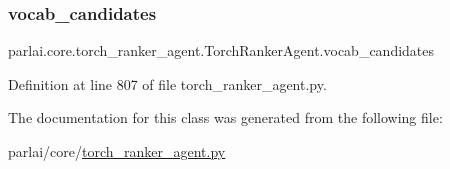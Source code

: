 \subsubsection{\texorpdfstring{vocab\+\_\+candidates}{vocab\_candidates}}
{\footnotesize\ttfamily parlai.\+core.\+torch\+\_\+ranker\+\_\+agent.\+Torch\+Ranker\+Agent.\+vocab\+\_\+candidates}



Definition at line 807 of file torch\+\_\+ranker\+\_\+agent.\+py.



The documentation for this class was generated from the following file\+:\begin{DoxyCompactItemize}
\item 
parlai/core/\hyperlink{torch__ranker__agent_8py}{torch\+\_\+ranker\+\_\+agent.\+py}\end{DoxyCompactItemize}
